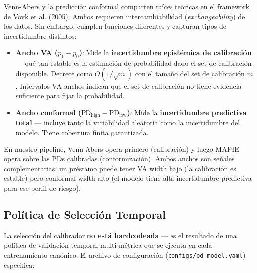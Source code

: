 \documentclass[
  spanish,
  11pt,
  letterpaper,
]{scrbook}
\providecommand{\tightlist}{%
  \setlength{\itemsep}{0pt}\setlength{\parskip}{0pt}}
\theoremstyle{plain}
\theoremstyle{remark}
\begin{document}
\begin{tcolorbox}[enhanced jigsaw, arc=.35mm, bottomrule=.15mm, bottomtitle=1mm, breakable, colback=white, colbacktitle=quarto-callout-note-color!10!white, colframe=quarto-callout-note-color-frame, coltitle=black, left=2mm, leftrule=.75mm, opacityback=0, opacitybacktitle=0.6, rightrule=.15mm, title=\textcolor{quarto-callout-note-color}{\faInfo}\hspace{0.5em}{Relación con predicción conformal}, titlerule=0mm, toprule=.15mm, toptitle=1mm]

Venn-Abers y la predicción conformal comparten raíces teóricas en el
framework de Vovk et al. (2005). Ambos requieren intercambiabilidad
(\emph{exchangeability}) de los datos. Sin embargo, cumplen funciones
diferentes y capturan tipos de incertidumbre distintos:

\begin{itemize}
\tightlist
\item
  \textbf{Ancho VA (\(p_1 - p_0\))}: Mide la \textbf{incertidumbre
  epistémica de calibración} --- qué tan estable es la estimación de
  probabilidad dado el set de calibración disponible. Decrece como
  \(O(1/\sqrt{m})\) con el tamaño del set de calibración \(m\).
  Intervalos VA anchos indican que el set de calibración no tiene
  evidencia suficiente para fijar la probabilidad.
\item
  \textbf{Ancho conformal
  (\(\text{PD}_{\text{high}} - \text{PD}_{\text{low}}\))}: Mide la
  \textbf{incertidumbre predictiva total} --- incluye tanto la
  variabilidad aleatoria como la incertidumbre del modelo. Tiene
  cobertura finita garantizada.
\end{itemize}

En nuestro pipeline, Venn-Abers opera primero (calibración) y luego
MAPIE opera sobre las PDs calibradas (conformización). Ambos anchos son
señales complementarias: un préstamo puede tener VA width bajo (la
calibración es estable) pero conformal width alto (el modelo tiene alta
incertidumbre predictiva para ese perfil de riesgo).

\end{tcolorbox}

\subsection{Política de Selección
Temporal}\label{sec-calibration-policy}

La selección del calibrador \textbf{no está hardcodeada} --- es el
resultado de una política de validación temporal multi-métrica que se
ejecuta en cada entrenamiento canónico. El archivo de configuración
(\texttt{configs/pd\_model.yaml}) especifica:
\end{document}
